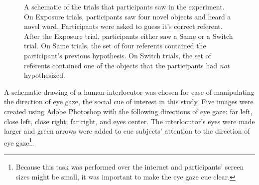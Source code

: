 \documentclass[10pt,letterpaper]{article}
\begin{document}
\begin{figure}[H]
	\centering
	\caption{A schematic of the trials that participants saw in the experiment. On Exposure trials, participants saw four novel objects and heard a novel word. Participants were asked to guess it's correct referent. After the Exposure trial, participants either saw a Same or a Switch trial. On Same trials, the set of four referents contained the participant's previous hypothesis. On Switch trials, the set of referents contained one of the objects that the participants had \emph{not} hypothesized.}
\end{figure}

A schematic drawing of a human interlocutor was chosen for ease of manipulating the direction of eye gaze, the social cue of interest in this study. Five images were created using Adobe Photoshop with the following directions of eye gaze: far left, close left, close right, far right, and eyes center. The interlocutor's eyes were made larger and green arrows were added to cue subjects' attention to the direction of eye gaze\footnote{Because this task was performed over the internet and participants' screen sizes might be small, it was important to make the eye gaze cue clear.}.
\end{document}
